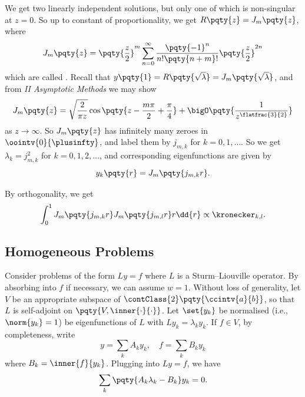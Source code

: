We get two linearly independent solutions, but only one of which is non-singular at \(z = 0\). So up to constant of proportionality, we get \(R\pqty{z} = J_m \pqty{z}\), where
\begin{equation}
    J_m \pqty{z} = \pqty{\frac{z}{2}}^m \sum_{n = 0}^{\infty} \frac{\pqty{-1}^n}{n! \pqty{n + m}!} \pqty{\frac{z}{2}}^{2n}
\end{equation}
which are called . Recall that \(y\pqty{1} = R\pqty{\sqrt{\lambda}} = J_m \pqty{\sqrt{\lambda}}\), and from \textit{II Asymptotic Methods} we may show
\begin{equation}
    J_m \pqty{z} = \sqrt{\frac{2}{\pi z}} \cos \pqty{z - \frac{m \pi}{2} + \frac{\pi}{4}} + \bigO\pqty{\frac{1}{z^{\flatfrac{3}{2}}}}
\end{equation}
as \(z \to \infty\). So \(J_m\pqty{z}\) has infinitely many zeroes in \(\oointv{0}{\plusinfty}\), and label them by \(j_{m, k}\) for \(k = 0, 1, \ldots\). So we get \(\lambda_k = j_{m, k}^2\) for \(k = 0, 1, 2, \ldots\), and corresponding eigenfunctions are given by
\begin{equation}
    y_k \pqty{r} = J_m \pqty{j_{m, k} r}.
\end{equation}

By orthogonality, we get
\begin{equation}
    \int_{0}^{1} J_m \pqty{j_{m, k} r} J_m \pqty{j_{m, l} r} r \dd{r} \propto \kronecker_{k, l}.
\end{equation}

\subsection{Homogeneous Problems}

Consider problems of the form \(L y = f\) where \(L\) is a Sturm--Liouville operator. By absorbing into \(f\) if necessary, we can assume \(w = 1\). Without loss of generality, let \(V\) be an appropriate subspace of \(\contClass{2}\pqty{\ccintv{a}{b}}\), so that \(L\) is self-adjoint on \(\pqty{V, \inner{\cdot}{\cdot}}\). Let \(\set{y_k}\) be normalised (i.e., \(\norm{y_k} = 1\)) be eigenfunctions of \(L\) with \(L y_k = \lambda_k y_k\). If \(f \in V\), by completeness, write
\begin{equation}
    y = \sum_k A_k y_k, \quad f = \sum_k B_k y_k
\end{equation}
where \(B_k = \inner{f}{y_k}\). Plugging into \(L y = f\), we have
\begin{equation}
    \sum_k \pqty{A_k \lambda_k - B_k} y_k = 0.
\end{equation}

